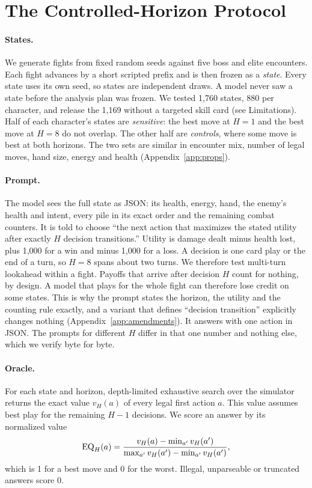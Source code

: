 \section{The Controlled-Horizon Protocol}
\label{sec:protocol}

\paragraph{States.} We generate fights from fixed random seeds against five boss and elite encounters. Each fight advances by a short scripted prefix and is then frozen as a \emph{state}. Every state uses its own seed, so states are independent draws. A model never saw a state before the analysis plan was frozen. We tested 1,760 states, 880 per character, and release the 1,169 without a targeted skill card (see Limitations). Half of each character's states are \emph{sensitive}: the best move at $H{=}1$ and the best move at $H{=}8$ do not overlap. The other half are \emph{controls}, where some move is best at both horizons. The two sets are similar in encounter mix, number of legal moves, hand size, energy and health (Appendix~\ref{app:props}).

\paragraph{Prompt.} The model sees the full state as JSON: its health, energy, hand, the enemy's health and intent, every pile in its exact order and the remaining combat counters. It is told to choose ``the next action that maximizes the stated utility after exactly $H$ decision transitions.'' Utility is damage dealt minus health lost, plus 1,000 for a win and minus 1,000 for a loss. A decision is one card play or the end of a turn, so $H{=}8$ spans about two turns. We therefore test multi-turn lookahead within a fight. Payoffs that arrive after decision $H$ count for nothing, by design. A model that plays for the whole fight can therefore lose credit on some states. This is why the prompt states the horizon, the utility and the counting rule exactly, and a variant that defines ``decision transition'' explicitly changes nothing (Appendix~\ref{app:amendments}). It answers with one action in JSON. The prompts for different $H$ differ in that one number and nothing else, which we verify byte for byte.

\paragraph{Oracle.} For each state and horizon, depth-limited exhaustive search over the simulator returns the exact value $v_H(a)$ of every legal first action $a$. This value assumes best play for the remaining $H-1$ decisions. We score an answer by its normalized value
\[
\mathrm{EQ}_{H}(a) = \frac{v_H(a) - \min_{a'} v_H(a')}{\max_{a'} v_H(a') - \min_{a'} v_H(a')},
\]
which is 1 for a best move and 0 for the worst. Illegal, unparseable or truncated answers score 0.

